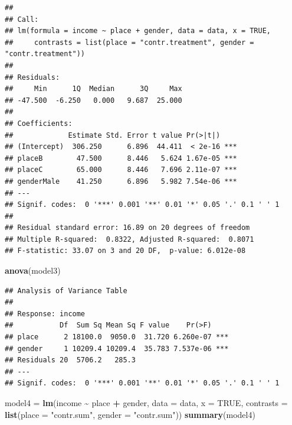 \documentclass[
]{article}
\newenvironment{Shaded}{\begin{snugshade}}{\end{snugshade}}
\newcommand{\AttributeTok}[1]{\textcolor[rgb]{0.13,0.29,0.53}{#1}}
\newcommand{\ConstantTok}[1]{\textcolor[rgb]{0.56,0.35,0.01}{#1}}
\newcommand{\FunctionTok}[1]{\textcolor[rgb]{0.13,0.29,0.53}{\textbf{#1}}}
\newcommand{\NormalTok}[1]{#1}
\newcommand{\OtherTok}[1]{\textcolor[rgb]{0.56,0.35,0.01}{#1}}
\newcommand{\SpecialCharTok}[1]{\textcolor[rgb]{0.81,0.36,0.00}{\textbf{#1}}}
\newcommand{\StringTok}[1]{\textcolor[rgb]{0.31,0.60,0.02}{#1}}
\begin{document}
\begin{verbatim}
## 
## Call:
## lm(formula = income ~ place + gender, data = data, x = TRUE, 
##     contrasts = list(place = "contr.treatment", gender = "contr.treatment"))
## 
## Residuals:
##     Min      1Q  Median      3Q     Max 
## -47.500  -6.250   0.000   9.687  25.000 
## 
## Coefficients:
##             Estimate Std. Error t value Pr(>|t|)    
## (Intercept)  306.250      6.896  44.411  < 2e-16 ***
## placeB        47.500      8.446   5.624 1.67e-05 ***
## placeC        65.000      8.446   7.696 2.11e-07 ***
## genderMale    41.250      6.896   5.982 7.54e-06 ***
## ---
## Signif. codes:  0 '***' 0.001 '**' 0.01 '*' 0.05 '.' 0.1 ' ' 1
## 
## Residual standard error: 16.89 on 20 degrees of freedom
## Multiple R-squared:  0.8322, Adjusted R-squared:  0.8071 
## F-statistic: 33.07 on 3 and 20 DF,  p-value: 6.012e-08
\end{verbatim}

\begin{Shaded}
\begin{Highlighting}[]
\FunctionTok{anova}\NormalTok{(model3)}
\end{Highlighting}
\end{Shaded}

\begin{verbatim}
## Analysis of Variance Table
## 
## Response: income
##           Df  Sum Sq Mean Sq F value    Pr(>F)    
## place      2 18100.0  9050.0  31.720 6.260e-07 ***
## gender     1 10209.4 10209.4  35.783 7.537e-06 ***
## Residuals 20  5706.2   285.3                      
## ---
## Signif. codes:  0 '***' 0.001 '**' 0.01 '*' 0.05 '.' 0.1 ' ' 1
\end{verbatim}

\begin{Shaded}
\begin{Highlighting}[]
\NormalTok{model4 }\OtherTok{=} \FunctionTok{lm}\NormalTok{(income }\SpecialCharTok{\textasciitilde{}}\NormalTok{ place }\SpecialCharTok{+}\NormalTok{ gender, }\AttributeTok{data =}\NormalTok{ data, }\AttributeTok{x =} \ConstantTok{TRUE}\NormalTok{, }\AttributeTok{contrasts =} \FunctionTok{list}\NormalTok{(}\AttributeTok{place =} \StringTok{"contr.sum"}\NormalTok{,}
    \AttributeTok{gender =} \StringTok{"contr.sum"}\NormalTok{))}
\FunctionTok{summary}\NormalTok{(model4)}
\end{Highlighting}
\end{Shaded}
\end{document}
